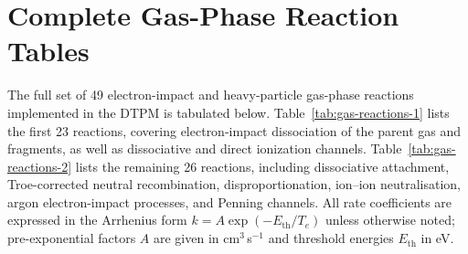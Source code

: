 \documentclass[11pt,a4paper]{report}
\begin{document}
\section{Complete Gas-Phase Reaction Tables}
\label{sec:reaction-tables}

The full set of 49 electron-impact and heavy-particle gas-phase reactions implemented in the DTPM is tabulated below.  Table~\ref{tab:gas-reactions-1} lists the first 23 reactions, covering electron-impact dissociation of the parent gas and fragments, as well as dissociative and direct ionization channels.  Table~\ref{tab:gas-reactions-2} lists the remaining 26 reactions, including dissociative attachment, Troe-corrected neutral recombination, disproportionation, ion--ion neutralisation, argon electron-impact processes, and Penning channels.  All rate coefficients are expressed in the Arrhenius form $k = A\exp(-E_\mathrm{th}/T_e)$ unless otherwise noted; pre-exponential factors $A$ are given in cm$^3$\,s$^{-1}$ and threshold energies $E_\mathrm{th}$ in eV.
\end{document}
